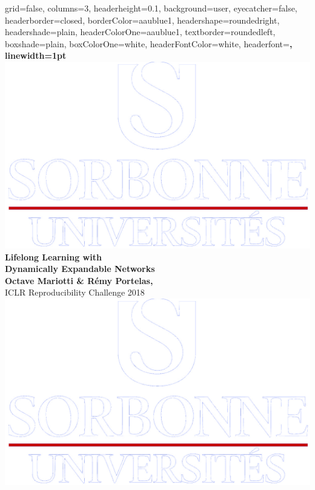 \documentclass[a0paper,portrait]{baposter}
\begin{document}
\begin{poster}{
  grid=false,
  columns=3,
  headerheight=0.1\textheight,
  background=user,
  eyecatcher=false,
  headerborder=closed,
  borderColor=aaublue1,
  headershape=roundedright,
  headershade=plain,
  headerColorOne=aaublue1,
  textborder=roundedleft,
  boxshade=plain,
  boxColorOne=white,
  headerFontColor=white,
  headerfont=\Large\sf\bf,
  linewidth=1pt
}
{
  \includegraphics[height=0.75\headerheight]{logo_sorb}
}
{\color{white}\bf
  Lifelong Learning with \\Dynamically Expandable Networks
}
{\color{white}\normalsize\\
  \textbf{Octave Mariotti \& Rémy Portelas,}\\ {ICLR Reproducibility Challenge 2018}\\
} %
{
  \includegraphics[height=0.75\headerheight]{logo_sorb}
}
\end{poster}
\end{document}

